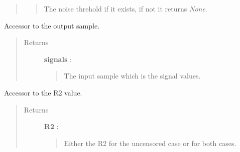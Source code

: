 \documentclass[letterpaper,10pt,english]{sphinxmanual}
\begin{document}
\begin{fulllineitems}
\begin{fulllineitems}
\begin{quote}
\begin{description}
\begin{quote}
The noise threhold if it exists, if not it returns \emph{None}.
\end{quote}

\end{description}\end{quote}

\end{fulllineitems}


\begin{fulllineitems}
\label{_generated/otpod.UnivariateLinearModelAnalysis:otpod.UnivariateLinearModelAnalysis.getOutputSample}
Accessor to the output sample.
\begin{quote}\begin{description}
\item[{Returns}] \leavevmode
\textbf{signals} : \href{http://doc.openturns.org/openturns-latest/sphinx/user\_manual/\_generated/openturns.NumericalSample.html\#openturns.NumericalSample}{}
\begin{quote}

The input sample which is the signal values.
\end{quote}

\end{description}\end{quote}

\end{fulllineitems}


\begin{fulllineitems}
\label{_generated/otpod.UnivariateLinearModelAnalysis:otpod.UnivariateLinearModelAnalysis.getR2}
Accessor to the R2 value.
\begin{quote}\begin{description}
\item[{Returns}] \leavevmode
\textbf{R2} : \href{http://doc.openturns.org/openturns-latest/sphinx/user\_manual/\_generated/openturns.NumericalPoint.html\#openturns.NumericalPoint}{}
\begin{quote}

Either the R2 for the uncensored case or for both cases.
\end{quote}

\end{description}\end{quote}


\end{fulllineitems}
\end{fulllineitems}
\end{document}
